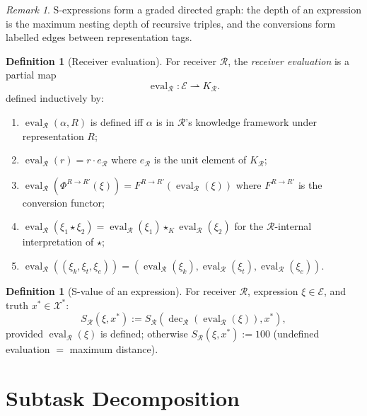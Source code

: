 \documentclass[twocolumn,11pt,a4paper]{article}
\theoremstyle{thmstyle}
\theoremstyle{thmstyle}
\theoremstyle{definition}
\newtheorem{definition}[theorem]{Definition}
\theoremstyle{remark}
\newtheorem{remark}[theorem]{Remark}
\DeclareMathOperator{\eval}{eval}
\DeclareMathOperator{\dec}{dec}
\newcommand{\Truth}{\mathcal{X}^{*}}
\newcommand{\Expr}{\mathcal{E}}
\newcommand{\receiver}{\mathcal{R}}
\newcommand{\Sscalar}{S}
\begin{document}
\begin{remark}\label{rem:expression-graph}
S-expressions form a graded directed graph: the depth
of an expression is the maximum nesting depth of
recursive triples, and the conversions form labelled
edges between representation tags.
\end{remark}

\begin{definition}[Receiver evaluation]\label{def:eval}
For receiver $\receiver$, the \emph{receiver evaluation}
is a partial map
\[
\eval_{\receiver} : \Expr \rightharpoonup K_{\receiver}.
\]
defined inductively by:
\begin{enumerate}[nosep,label=(\arabic*)]
\item $\eval_{\receiver}(\alpha, R)$ is defined iff
      $\alpha$ is in $\receiver$'s knowledge framework
      under representation $R$;
\item $\eval_{\receiver}(r) = r \cdot e_{\receiver}$
      where $e_{\receiver}$ is the unit element of
      $K_{\receiver}$;
\item $\eval_{\receiver}(\Phi^{R \to R'}(\xi)) =
      F^{R \to R'}(\eval_{\receiver}(\xi))$ where
      $F^{R \to R'}$ is the conversion functor;
\item $\eval_{\receiver}(\xi_{1} \star \xi_{2}) =
      \eval_{\receiver}(\xi_{1}) \star_{K}
      \eval_{\receiver}(\xi_{2})$ for the
      $\receiver$-internal interpretation of $\star$;
\item $\eval_{\receiver}((\xi_{k}, \xi_{t}, \xi_{e}))
      = (\eval_{\receiver}(\xi_{k}),
         \eval_{\receiver}(\xi_{t}),
         \eval_{\receiver}(\xi_{e}))$.
\end{enumerate}
\end{definition}

\begin{definition}[S-value of an expression]\label{def:s-value-exp}
For receiver $\receiver$, expression $\xi \in \Expr$,
and truth $x^{*} \in \Truth$:
\[
\Sscalar_{\receiver}(\xi, x^{*})
:= \Sscalar_{\receiver}(\dec_{\receiver}(\eval_{\receiver}(\xi)), x^{*}),
\]
provided $\eval_{\receiver}(\xi)$ is defined; otherwise
$\Sscalar_{\receiver}(\xi, x^{*}) := 100$
(undefined evaluation $=$ maximum distance).
\end{definition}

\section{Subtask Decomposition}
\label{sec:subtask-decomposition}
\end{document}
